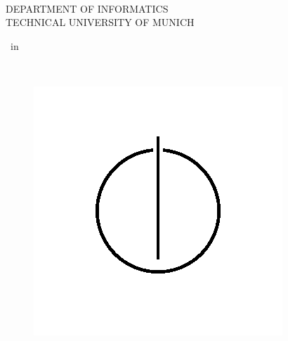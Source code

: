 %
\begin{titlepage}
	\setlength{\evensidemargin}{22pt}
	\setlength{\oddsidemargin}{22pt}
	\vspace{4cm}
	\hfill
	
	\begin{center}
		\oTUM{4cm}\\ 
		\vspace{5mm}     
		\huge DEPARTMENT OF INFORMATICS\\ 
		\vspace{0.5cm}
		\large TECHNICAL UNIVERSITY OF MUNICH\\
		\vspace{1mm}
	\end{center}
	
	\vspace{13mm}
	
	\begin{center}
		{\Large \thesisType\ in \thesisUniversityFaculty}
		\vspace{20mm}
		
		\begin{spacing}{1.5}
			{\huge\bfseries \thesisTitle}\\%
		\end{spacing}
		
		\vspace{15mm}
		{\LARGE \thesisAuthor}
		
		\vspace{20mm}
		
		\begin{figure}[h!]
			\centering
			\includegraphics[width=0.3\linewidth]{gfx/infologo_BW.png}
		\end{figure}
	\end{center}
	
\end{titlepage}


